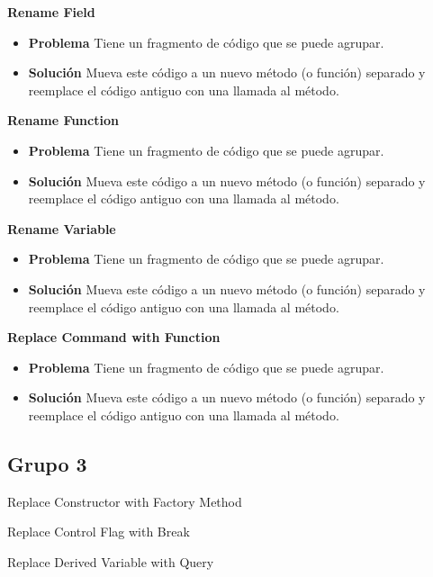 \documentclass[11pt,a4paper,oneside]{book}
\begin{document}
\textbf{Rename Field}

\begin{itemize}
    \item \textbf{Problema} Tiene un fragmento de código que se puede agrupar.
    \item \textbf{Solución} Mueva este código a un nuevo método (o función) separado y reemplace el código antiguo con una llamada al método.
\end{itemize}

\textbf{Rename Function}

\begin{itemize}
    \item \textbf{Problema} Tiene un fragmento de código que se puede agrupar.
    \item \textbf{Solución} Mueva este código a un nuevo método (o función) separado y reemplace el código antiguo con una llamada al método.
\end{itemize}

\textbf{Rename Variable}

\begin{itemize}
    \item \textbf{Problema} Tiene un fragmento de código que se puede agrupar.
    \item \textbf{Solución} Mueva este código a un nuevo método (o función) separado y reemplace el código antiguo con una llamada al método.
\end{itemize}

\textbf{Replace Command with Function}

\begin{itemize}
    \item \textbf{Problema} Tiene un fragmento de código que se puede agrupar.
    \item \textbf{Solución} Mueva este código a un nuevo método (o función) separado y reemplace el código antiguo con una llamada al método.
\end{itemize}


\subsection{Grupo 3}
Replace Constructor with Factory Method

Replace Control Flag with Break

Replace Derived Variable with Query
\end{document}
